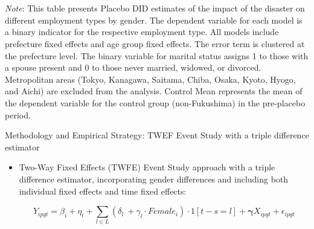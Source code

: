\documentclass[serif, aspectratio=169]{beamer}
\begin{document}
\begin{frame}[label=different_types_placebo]
\begin{table}[htbp]
\\\\{\linewidth}{\tiny \textit{Note}: This table presents Placebo DID estimates of the impact of the disaster on different employment types by gender. The dependent variable for each model is a binary indicator for the respective employment type. All models include prefecture fixed effects and age group fixed effects. The error term is clustered at the prefecture level. The binary variable for marital status assigns 1 to those with a spouse present and 0 to those never married, widowed, or divorced. Metropolitan areas (Tokyo, Kanagawa, Saitama, Chiba, Osaka, Kyoto, Hyogo, and Aichi) are excluded from the analysis. Control Mean represents the mean of the dependent variable for the control group (non-Fukushima) in the pre-placebo period.}
\end{table}

\end{frame}

\begin{frame}{Methodology and Empirical Strategy: TWEF Event Study with a triple difference estimator}
    \begin{itemize}
    \item Two-Way Fixed Effects (TWFE) Event Study approach with a triple difference estimator, incorporating gender differences and including both individual fixed effects and time fixed effects:

\begin{equation}
Y_{ipgt} = \beta_i + \eta_t + \sum_{l \in L} (\delta_l\ + \gamma_l \cdot Female_i) \cdot 1[t-s = l] +  \mathbf \gamma {X}_{ipgt}+\epsilon_{ipgt}
\end{equation}
\end{itemize}

\end{frame}

\end{document}

